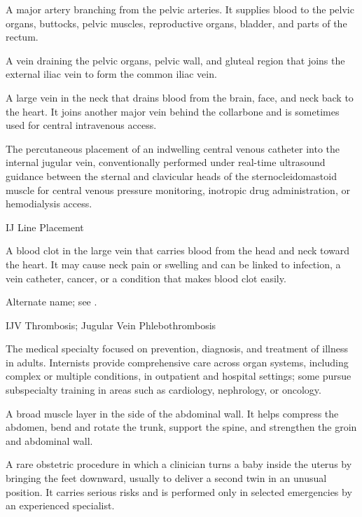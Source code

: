  A major artery branching from the pelvic arteries. It supplies blood to the pelvic organs, buttocks, pelvic muscles, reproductive organs, bladder, and parts of the rectum.

 A vein draining the pelvic organs, pelvic wall, and gluteal region that joins the external iliac vein to form the common iliac vein.

 A large vein in the neck that drains blood from the brain, face, and neck back to the heart. It joins another major vein behind the collarbone and is sometimes used for central intravenous access.

 The percutaneous placement of an indwelling central venous catheter into the internal jugular vein, conventionally performed under real-time ultrasound guidance between the sternal and clavicular heads of the sternocleidomastoid muscle for central venous pressure monitoring, inotropic drug administration, or hemodialysis access.

\synonyms
IJ Line Placement

 A blood clot in the large vein that carries blood from the head and neck toward the heart. It may cause neck pain or swelling and can be linked to infection, a vein catheter, cancer, or a condition that makes blood clot easily.

 Alternate name; see .

\synonyms
IJV Thrombosis; Jugular Vein Phlebothrombosis

 The medical specialty focused on prevention, diagnosis, and treatment of illness
in adults. Internists provide comprehensive care across organ systems, including complex
or multiple conditions, in outpatient and hospital settings; some pursue subspecialty
training in areas such as cardiology, nephrology, or oncology.

 A broad muscle layer in the side of the abdominal wall. It helps compress the abdomen, bend and rotate the trunk, support the spine, and strengthen the groin and abdominal wall.

 A rare obstetric procedure in which a clinician turns a baby inside the uterus by bringing the feet downward, usually to deliver a second twin in an unusual position. It carries serious risks and is performed only in selected emergencies by an experienced specialist.

